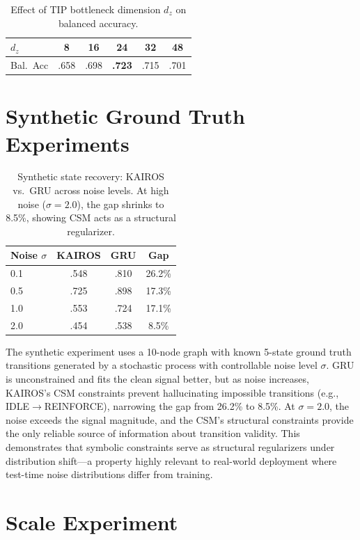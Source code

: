 \documentclass[11pt]{article}
\begin{document}
\begin{table}[h]
\centering
\caption{Effect of TIP bottleneck dimension $d_z$ on balanced accuracy.}
\begin{tabular}{@{}lccccc@{}}
\toprule
$d_z$ & 8 & 16 & \textbf{24} & 32 & 48 \\
\midrule
Bal.\ Acc & .658 & .698 & \textbf{.723} & .715 & .701 \\
\bottomrule
\end{tabular}
\end{table}

\section{Synthetic Ground Truth Experiments}

\begin{table}[h]
\centering
\caption{Synthetic state recovery: KAIROS vs.\ GRU across noise levels. At high noise ($\sigma = 2.0$), the gap shrinks to 8.5\%, showing CSM acts as a structural regularizer.}
\label{tab:synthetic}
\small
\begin{tabular}{lccc}
\toprule
\textbf{Noise $\sigma$} & \textbf{KAIROS} & \textbf{GRU} & \textbf{Gap} \\
\midrule
0.1 & .548 & .810 & 26.2\% \\
0.5 & .725 & .898 & 17.3\% \\
1.0 & .553 & .724 & 17.1\% \\
2.0 & .454 & .538 & 8.5\% \\
\bottomrule
\end{tabular}
\end{table}

The synthetic experiment uses a 10-node graph with known 5-state ground truth transitions generated by a stochastic process with controllable noise level $\sigma$. GRU is unconstrained and fits the clean signal better, but as noise increases, KAIROS's CSM constraints prevent hallucinating impossible transitions (e.g., IDLE$\to$REINFORCE), narrowing the gap from 26.2\% to 8.5\%. At $\sigma = 2.0$, the noise exceeds the signal magnitude, and the CSM's structural constraints provide the only reliable source of information about transition validity. This demonstrates that symbolic constraints serve as structural regularizers under distribution shift---a property highly relevant to real-world deployment where test-time noise distributions differ from training.

\section{Scale Experiment}
\end{document}
